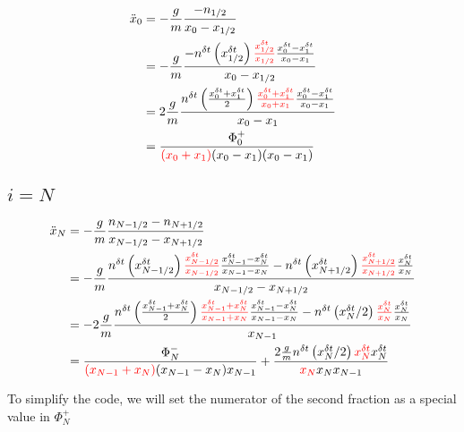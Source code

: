 \documentclass{article}
\begin{document}
\begin{equation}
  \begin{split}
    \ddot{x}_0 &=-\frac{g}{m}\frac{-n_{1/2}}{x_{0}-x_{1/2}}\\
    &=-\frac{g}{m}\frac{-n^{\delta t}\left(x^{\delta t}_{1/2}\right)\textcolor{red}{\frac{x^{\delta t}_{1/2}}{x_{1/2}}}\frac{x^{\delta t}_0-x^{\delta t}_{1}}{x_0-x_{1}}}{x_0-x_{1/2}}\\
    &=2\frac{g}{m}\frac{n^{\delta t}\left(\frac{x^{\delta t}_0+x^{\delta t}_1}{2}\right)\textcolor{red}{\frac{x^{\delta t}_0+x^{\delta t}_1}{x_0+x_1}}\frac{x^{\delta t}_0-x^{\delta t}_{1}}{x_0-x_{1}}}{x_0-x_1}\\
    &=\frac{\Phi^+_0}{\textcolor{red}{(x_0+x_1)}(x_0-x_1)(x_0-x_1)}
  \end{split}
\end{equation}

\subsection{$i=N$}

\begin{equation}
  \begin{split}
    \ddot{x}_N &=-\frac{g}{m}\frac{n_{N-1/2}-n_{N+1/2}}{x_{N-1/2}-x_{N+1/2}}\\
    &= -\frac{g}{m}
    \frac{
    n^{\delta t}\left(x^{\delta t}_{N-1/2}\right)\textcolor{red}{\frac{x^{\delta t}_{N-1/2}}{x_{N-1/2}}}\frac{x^{\delta t}_{N-1}-x^{\delta t}_N}{x_{N-1}-x_N}
    -n^{\delta t}\left(x^{\delta t}_{N+1/2}\right)\textcolor{red}{\frac{x^{\delta t}_{N+1/2}}{x_{N+1/2}}}\frac{x^{\delta t}_N}{x_N}}
    {x_{N-1/2}-x_{N+1/2}}\\
    &= -2\frac{g}{m}
    \frac{
    n^{\delta t}\left(\frac{x^{\delta t}_{N-1}+x^{\delta t}_N}{2}\right)\textcolor{red}{\frac{x^{\delta t}_{N-1}+x^{\delta t}_N}{x_{N-1}+x_N}}\frac{x^{\delta t}_{N-1}-x^{\delta t}_N}{x_{N-1}-x_N}
    -n^{\delta t}\left(x^{\delta t}_N/2\right)\textcolor{red}{\frac{x^{\delta t}_N}{x_N}}\frac{x^{\delta t}_N}{x_N}}
    {x_{N-1}}\\
    &= \frac{\Phi^-_N}{\textcolor{red}{(x_{N-1}+x_N)}(x_{N-1}-x_N)x_{N-1}}+\frac{2\frac{g}{m}n^{\delta t}\left(x^{\delta t}_N/2\right)\textcolor{red}{x^{\delta t}_N}x^{\delta t}_N}{\textcolor{red}{x_N}x_Nx_{N-1}}
  \end{split}
\end{equation}


To simplify the code, we will set the numerator of the second fraction as a special value in $\Phi^+_N$
\end{document}
